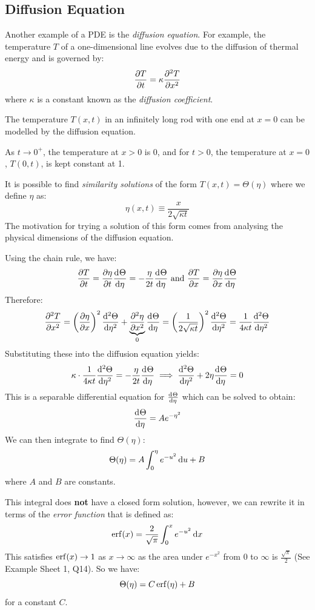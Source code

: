 \documentclass[../main.tex]{subfiles}
\begin{document}
\subsection{Diffusion Equation}
Another example of a PDE is the \textit{diffusion equation}.
For example, the temperature $T$ of a one-dimensional line evolves due to the diffusion of thermal energy and is governed by:
\[
  \pderiv{T}{t}=\kappa \pderiv[2]{T}{x}
\]
where $\kappa$ is a constant known as the \textit{diffusion coefficient}.
\begin{example}
  The temperature $T(x, t)$ in an infinitely long rod with one end at $x = 0$ can be modelled by the diffusion equation.

  As $t \to 0^{+}$, the temperature at $x > 0$ is 0, and for $t > 0$, the temperature at $x = 0$, $T(0, t)$, is kept constant at 1.

  It is possible to find \textit{similarity solutions} of the form $T(x, t) = \Theta(\eta)$ where we define $\eta$ as:
  \[
    \eta(x, t) \equiv \frac{x}{2\sqrt{\kappa t}}
  \]
  The motivation for trying a solution of this form comes from analysing the physical dimensions of the diffusion equation.

  Using the chain rule, we have:
  \[
    \pderiv{T}{t} = \pderiv{\eta}{t} \deriv{\Theta}{\eta} = -\frac{\eta}{2t}\deriv{\Theta}{\eta} \text{ and }
    \pderiv{T}{x} = \pderiv{\eta}{x} \deriv{\Theta}{\eta}
  \]
  Therefore:
  \[
    \pderiv[2]{T}{x} = \left(\pderiv{\eta}{x}\right)^2 \deriv[2]{\Theta}{\eta} + \underbrace{\pderiv[2]{\eta}{x}}_{0} \deriv{\Theta}{\eta} = \left(\frac{1}{2\sqrt{\kappa t}}\right)^2 \deriv[2]{\Theta}{\eta} = \frac{1}{4\kappa t} \deriv[2]{\Theta}{\eta} \\
  \]
  Substituting these into the diffusion equation yields:
  \[
    \kappa \cdot \frac{1}{4\kappa t} \deriv[2]{\Theta}{\eta} = -\frac{\eta}{2t}\deriv{\Theta}{\eta} \implies \deriv[2]{\Theta}{\eta} + 2\eta\deriv{\Theta}{\eta} = 0
  \]
  This is a separable differential equation for $\deriv{\Theta}{\eta}$ which can be solved to obtain:
  \[
    \deriv{\Theta}{\eta} = Ae^{-\eta^2}
  \]
  We can then integrate to find $\Theta(\eta)$:
  \[
    \Theta(\eta) = A \int_{0}^{\eta} e^{-u^2} \d{u} + B
  \]
  where $A$ and $B$ are constants.

  This integral does \textbf{not} have a closed form solution, however, we can rewrite it in terms of the \textit{error function} that is defined as:
  \[
    \erf(x) = \frac{2}{\sqrt{\pi}} \int_{0}^{x} e^{-u^2} \d{x}
  \]
  This satisfies $\operatorname{erf}(x) \to 1$ as $x \to \infty$ as the area under $e^{-x^2}$ from $0$ to $\infty$ is $\frac{\sqrt{\pi}}{2}$ (See Example Sheet 1, Q14). So we have:
  \[
    \Theta(\eta) = C \operatorname{erf}(\eta) + B
  \]
  for a constant $C$.


\end{example}
\end{document}
